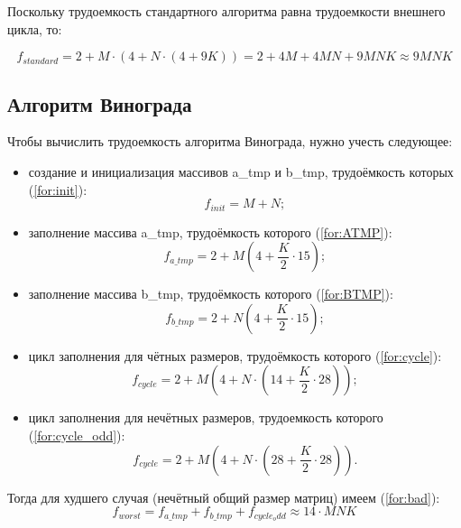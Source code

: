 Поскольку трудоемкость стандартного алгоритма равна трудоемкости внешнего цикла, то:

\begin{equation}
	\label{for:standard}
	f_{standard} = 2 + M \cdot (4 + N \cdot (4 + 9K)) = 2 + 4M + 4MN + 9MNK \approx 9MNK
\end{equation}


\subsection{Алгоритм Винограда}

Чтобы вычислить трудоемкость алгоритма Винограда, нужно учесть следующее: 

\begin{itemize}
	\item создание и инициализация массивов a\_tmp и b\_tmp, трудоёмкость которых (\ref{for:init}):
	\begin{equation}
		\label{for:init}
		f_{init} = M + N;
	\end{equation}
	
	\item заполнение массива a\_tmp, трудоёмкость которого (\ref{for:ATMP}):
	\begin{equation}
		\label{for:ATMP}
		f_{a\_tmp} = 2 + M (4 + \frac{K}{2} \cdot 15);
	\end{equation}
	
	\item заполнение массива b\_tmp, трудоёмкость которого (\ref{for:BTMP}):
	\begin{equation}
		\label{for:BTMP}
		f_{b\_tmp} = 2 + N (4 + \frac{K}{2} \cdot 15);
	\end{equation}
	
	\item цикл заполнения для чётных размеров, трудоёмкость которого (\ref{for:cycle}):
	\begin{equation}
		\label{for:cycle}
		f_{cycle} = 2 + M (4 + N \cdot (14 + \frac{K}{2} \cdot 28));
	\end{equation}
	
	\item цикл заполнения для нечётных размеров, трудоемкость которого (\ref{for:cycle_odd}):
	\begin{equation}
		\label{for:cycle_odd}
		f_{cycle} = 2 + M (4 + N \cdot (28 + \frac{K}{2} \cdot 28)).
	\end{equation}
\end{itemize}

Тогда для худшего случая (нечётный общий размер матриц) имеем (\ref{for:bad}):
\begin{equation}
	\label{for:bad}
	f_{worst} =  f_{a\_tmp} + f_{b\_tmp} + f_{cycle_odd}\approx 14 \cdot MNK
\end{equation}

